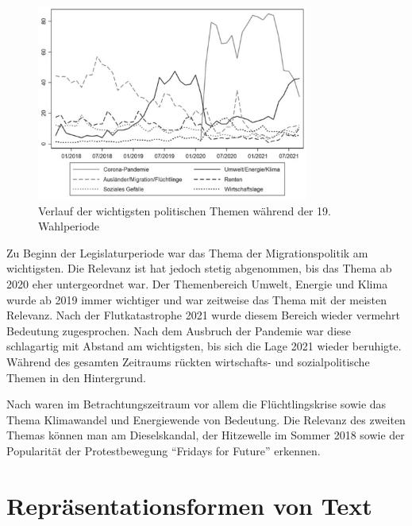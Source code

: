 \begin{figure}[H]
    \centering
    \includegraphics[width=0.8\textwidth]{data/images/themenkonjunktur.png}
    \caption{Verlauf der wichtigsten politischen Themen während der 19. Wahlperiode \autocite{engler_wettbewerb_2022, forschungsgruppe_wahlen_forschungsgruppe_nodate}} \label{fig:themenkonjunktur}
\end{figure}

Zu Beginn der Legislaturperiode war das Thema der Migrationspolitik am wichtigsten. Die Relevanz ist hat jedoch stetig abgenommen, bis das Thema ab 2020 eher untergeordnet war. Der Themenbereich Umwelt, Energie und Klima wurde ab 2019 immer wichtiger und war zeitweise das Thema mit der meisten Relevanz. Nach der Flutkatastrophe 2021 wurde diesem Bereich wieder vermehrt Bedeutung zugesprochen. Nach dem Ausbruch der Pandemie war diese schlagartig mit Abstand am wichtigsten, bis sich die Lage 2021 wieder beruhigte. Während des gesamten Zeitraums rückten wirtschafts- und sozialpolitische Themen in den Hintergrund.

Nach \textcite{niedermayer_entwicklung_2020} waren im Betrachtungszeitraum vor allem die Flüchtlingskrise sowie das Thema Klimawandel und Energiewende von Bedeutung. Die Relevanz des zweiten Themas können man am Dieselskandal, der Hitzewelle im Sommer \num{2018} sowie der Popularität der Protestbewegung \enquote{Fridays for Future} erkennen.

\section{Repräsentationsformen von Text}


